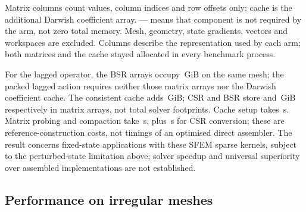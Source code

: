 \documentclass[sigconf,nonacm]{acmart}
\begin{document}
\begin{table}[t]
  \centering
  \small
  \caption{Equivalent consistent Darwish applications: FP64, 72 Grace cores,
    affine interior, $n=128$, pack size 1024, Rhie--Chow enabled, perturbation
    0.017. Means and full ranges of 24 windows per arm, each with 60 applications.
    Three processes each keep both matrices and the cache allocated while
    measuring all four implementations in eight blocks with balanced ordering.
    Directions are coordinate-based; each measurement follows 30 warmups.
    Transparent huge pages are disabled; setup and validation are excluded. Ranges are not confidence intervals.}
  \label{tab:consistentmatrix}
  
\par\smallskip\footnotesize Matrix columns count values, column indices and row offsets only; cache is the additional Darwish coefficient array. --- means that component is not required by the arm, not zero total memory. Mesh, geometry, state gradients, vectors and workspaces are excluded. Columns describe the representation used by each arm; both matrices and the cache stayed allocated in every benchmark process.
\end{table}

For the lagged operator, the BSR arrays occupy \dcLaggedGiB{}\,GiB on the same mesh; the packed lagged action requires neither those matrix arrays nor the Darwish coefficient cache. The consistent cache adds \cmCacheGiB{}\,GiB; CSR and BSR store \cmCsrGiB{} and
\cmBsrGiB{}\,GiB respectively in matrix arrays, not total solver footprints.
Cache setup takes \cmCacheSetup{}\,s. Matrix probing and compaction take
\cmAssembly{}\,s, plus \cmConversion{}\,s for CSR conversion; these are
reference-construction costs, not timings of an optimised direct assembler.
The result concerns fixed-state applications with these SFEM sparse kernels,
subject to the perturbed-state limitation above; solver speedup and universal
superiority over assembled implementations are not established.

\subsection{Performance on irregular meshes}
\label{sec:res:unstructured}
\end{document}
